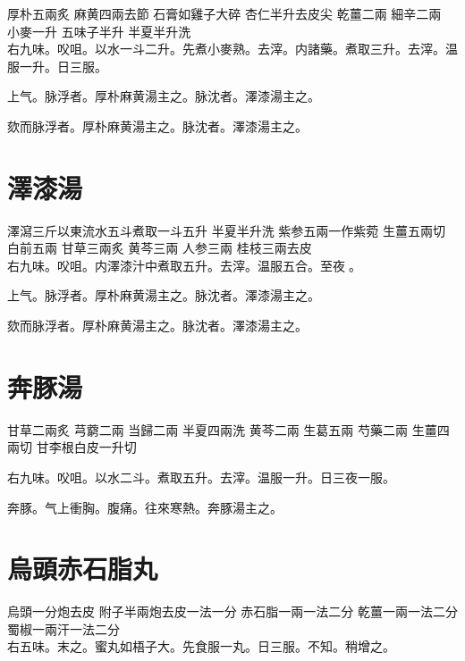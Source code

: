 厚朴{\scriptsize 五兩炙} 麻黄{\scriptsize 四兩去節} 石膏{\scriptsize 如雞子大碎} 杏仁{\scriptsize 半升去皮尖} 乾薑{\scriptsize 二兩} 細辛{\scriptsize 二兩} 小麥{\scriptsize 一升} 五味子{\scriptsize 半升} 半夏{\scriptsize 半升洗}\\
右九味。㕮咀。以水一斗二升。先煮小麥熟。去滓。内諸藥。煮取三升。去滓。温服一升。日三服。

上气。脉浮者。厚朴麻黄湯主之。脉沈者。澤漆湯主之。{\wuben}

欬而脉浮者。厚朴麻黄湯主之。脉沈者。澤漆湯主之。{\dengben}

\section{澤漆湯}

澤瀉{\scriptsize 三斤以東流水五斗煮取一斗五升} 半夏{\scriptsize 半升洗} 紫参{\scriptsize 五兩一作紫菀} 生薑{\scriptsize 五兩切} 白前{\scriptsize 五兩} 甘草{\scriptsize 三兩炙} 黄芩{\scriptsize 三兩} 人参{\scriptsize 三兩} 桂枝{\scriptsize 三兩去皮}\\
右九味。㕮咀。内澤漆汁中煮取五升。去滓。温服五合。至夜{\sungtpii 𥁞}。

上气。脉浮者。厚朴麻黄湯主之。脉沈者。澤漆湯主之。{\wuben}

欬而脉浮者。厚朴麻黄湯主之。脉沈者。澤漆湯主之。{\dengben}

\section{奔豚湯}

甘草{\scriptsize 二兩{\khaaitp 炙}} 芎藭{\scriptsize 二兩} 当歸{\scriptsize 二兩} 半夏{\scriptsize 四兩{\khaaitp 洗}} 黄芩{\scriptsize 二兩} 生葛{\scriptsize 五兩} 芍藥{\scriptsize 二兩} 生薑{\scriptsize 四兩{\khaaitp 切}} 甘李根白皮{\scriptsize 一升{\khaaitp 切}}

右九味。{\khaaitp 㕮咀。}以水二斗。煮取五升。{\khaaitp 去滓。}温服一升。日三夜一服。

奔豚。气上衝胸。腹痛。往來寒熱。奔豚湯主之。

\section{烏頭赤石脂丸}

烏頭{\scriptsize 一分炮去皮} 附子{\scriptsize 半兩炮去皮一法一分} 赤石脂{\scriptsize 一兩一法二分} 乾薑{\scriptsize 一兩一法二分} 蜀椒{\scriptsize 一兩汗一法二分}\\
右五味。末之。蜜丸如梧子大。先食服一丸。日三服。不知。稍增之。

